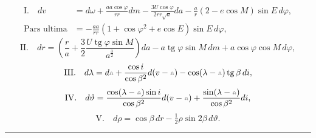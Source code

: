 \[
\begin{aligned}
\mathrm{I.}\quad dv&=d\omega+\frac{aa\cos\varphi}{rr}dm-\frac{3U\cos\varphi}{2rr\surd a}da-\frac ar(2-e\cos M)\sin E\,d\varphi,\\[1ex]
\text{Pars ultima}&=-\frac{aa}{rr}(1+\cos\varphi^2+e\cos E)\sin E\,d\varphi,
\end{aligned}
\]
\[
\mathrm{II.}\quad dr=\left(\frac ra+\frac32\frac{U\operatorname{tg}\varphi\sin M}{a^{\frac32}}\right)da-a\operatorname{tg}\varphi\sin M\,dm+a\cos\varphi\cos M\,d\varphi,
\]
\[
\mathrm{III.}\quad d\lambda=d\AstNode+\frac{\cos i}{\cos\beta^2}d(v-\AstNode)-\cos(\lambda-\AstNode)\operatorname{tg}\beta\,di,
\]
\[
\mathrm{IV.}\quad d\vartheta=\frac{\cos(\lambda-\AstNode)\sin i}{\cos\beta^2}d(v-\AstNode)+\frac{\sin(\lambda-\AstNode)}{\cos\beta^2}di,
\]
\[
\mathrm{V.}\quad d\rho=\cos\beta\,dr-\tfrac12\rho\sin2\beta\,d\vartheta.
\]
\begin{center}\rule{0.25\linewidth}{0.35pt}\end{center}
\clearpage\endgroup
